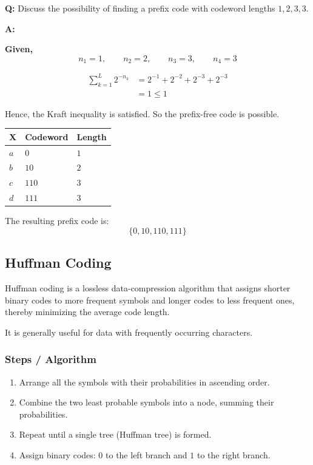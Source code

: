 \documentclass[11pt,a4paper]{book}
\renewcommand{\arraystretch}{1.4}
\newenvironment{definitionbox}[1][Definition]{%
    \begin{tcolorbox}[
        enhanced,
        breakable,
        colback=primaryblue!10,
        colframe=primaryblue!150,
        title=#1,
        fonttitle=\bfseries,
        sharp corners,
        boxrule=0.8pt,
        left=8pt,
        right=8pt,
        top=6pt,
        bottom=6pt
    ]
}{\end{tcolorbox}}
\newcounter{qna}[chapter]
\renewcommand{\theqna}{\thechapter.\arabic{qna}}
\newenvironment{questionanswerbox}[1][Example]{%
    \refstepcounter{qna}
    \begin{tcolorbox}[
        enhanced,
        breakable,
        colback=softlavender!10,
        colframe=softlavender!200,
        title={#1~\theqna},
        fonttitle=\bfseries,
        coltitle=white,
        colbacktitle=softlavender!200,
        sharp corners,
        boxrule=1pt,
        left=8pt,
        right=8pt,
        top=6pt,
        bottom=6pt
    ]
}{\end{tcolorbox}}
\begin{document}
\begin{questionanswerbox}[Prefix Code Condition Example]
\textbf{Q:} Discuss the possibility of finding a prefix code with codeword lengths \(1,2,3,3\).

\textbf{A:}

\textbf{Given,}
\[
n_1=1,\qquad n_2=2,\qquad n_3=3,\qquad n_4=3
\]

\begin{align*}
\sum_{k=1}^{L} 2^{-n_k}
&= 2^{-1}+2^{-2}+2^{-3}+2^{-3}\\
&= 1 \le 1
\end{align*}

Hence, the Kraft inequality is satisfied. So the prefix-free code is possible.

\renewcommand{\arraystretch}{1.3}
\setlength{\tabcolsep}{8pt}
\begin{center}
\begin{tabular}{|C{1.6cm}|C{2.8cm}|C{1.8cm}|}
    \hline
    \textbf{X} & \textbf{Codeword} & \textbf{Length} \\ \hline
    \(a\) & \(0\)   & \(1\) \\ \hline
    \(b\) & \(10\)  & \(2\) \\ \hline
    \(c\) & \(110\) & \(3\) \\ \hline
    \(d\) & \(111\) & \(3\) \\ \hline
\end{tabular}
\end{center}

The resulting prefix code is:
\[
\{0,10,110,111\}
\]
\end{questionanswerbox}

\subsection{Huffman Coding}

\begin{definitionbox}[Huffman Coding]
Huffman coding is a lossless data-compression algorithm that assigns shorter binary codes to more frequent symbols and longer codes to less frequent ones, thereby minimizing the average code length.
\end{definitionbox}

It is generally useful for data with frequently occurring characters.

\subsubsection{Steps / Algorithm}
\begin{enumerate}
    \item Arrange all the symbols with their probabilities in ascending order.
    \item Combine the two least probable symbols into a node, summing their probabilities.
    \item Repeat until a single tree (Huffman tree) is formed.
    \item Assign binary codes: \(0\) to the left branch and \(1\) to the right branch.
\end{enumerate}
\end{document}
